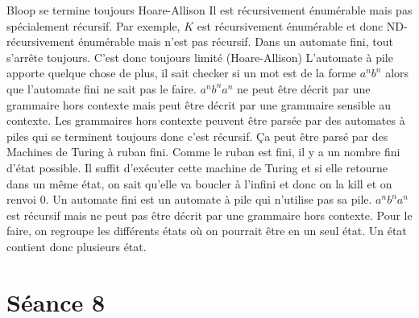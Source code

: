\begin{mcqs}
  {Bloop se termine toujours}
  {Hoare-Allison}
  {Il est récursivement énumérable mais pas spécialement récursif.
  Par exemple, $K$ est récursivement énumérable et donc ND-récursivement énumérable mais n'est pas récursif.}
  {Dans un automate fini, tout s'arrête toujours. C'est donc toujours limité (Hoare-Allison)}
  {L'automate à pile apporte quelque chose de plus, il sait checker si un mot est de la forme $a^nb^n$ alors que l'automate fini ne sait pas le faire.}
  {$a^nb^na^n$ ne peut être décrit par une grammaire hors contexte mais peut être décrit par une grammaire sensible au contexte.}
  {Les grammaires hors contexte peuvent être parsée par des automates à piles qui se terminent toujours donc c'est récursif.}
  {Ça peut être parsé par des Machines de Turing à ruban fini.
  Comme le ruban est fini, il y a un nombre fini d'état possible.
  Il suffit d'exécuter cette machine de Turing et si elle retourne dans un même état, on sait qu'elle va boucler à l'infini
  et donc on la kill et on renvoi 0.}
  {Un automate fini est un automate à pile qui n'utilise pas sa pile.}
  {$a^nb^na^n$ est récursif mais ne peut pas être décrit par une grammaire hors contexte.}
  {Pour le faire, on regroupe les différents états où on pourrait être en un seul état.
  Un état contient donc plusieurs état.}
\end{mcqs}

\section*{Séance 8}


